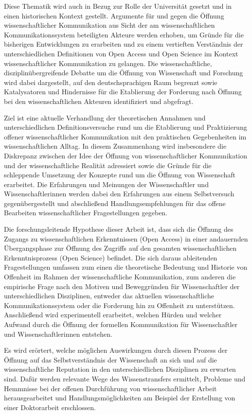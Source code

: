 Diese Thematik wird auch in Bezug zur Rolle der Universität gesetzt und in einen historischen Kontext gestellt. Argumente für und gegen die Öffnung wissenschaftlicher Kommunikation aus Sicht der am wissenschaftlichen Kommunikationssystem beteiligten Akteure werden erhoben, um Gründe für die bisherigen Entwicklungen zu erarbeiten und zu einem vertieften Verständnis der unterschiedlichen Definitionen von Open Access und Open Science im Kontext wissenschaftlicher Kommunikation zu gelangen. Die wissenschaftliche, disziplinübergreifende Debatte um die Öffnung von Wissenschaft und Forschung wird dabei dargestellt, auf den deutschsprachigen Raum begrenzt sowie Katalysatoren und Hindernisse für die Etablierung der Forderung nach Öffnung bei den wissenschaftlichen Akteuren identifiziert und abgefragt.

Ziel ist eine aktuelle Verhandlung der theoretischen Annahmen und unterschiedlichen Definitionsversuche rund um die Etablierung und Praktizierung offener wissenschaftlicher Kommunikation mit den praktischen Gegebenheiten im wissenschaftlichen Alltag. In diesem Zusammenhang wird insbesondere die Diskrepanz zwischen der Idee der Öffnung von wissenschaftlicher Kommunikation und der wissenschaftliche Realität \cite{Scheliga_2014} adressiert sowie die Gründe für die schleppende Umsetzung der Konzepte rund um die Öffnung von Wissenschaft erarbeitet. Die Erfahrungen und Meinungen der Wissenschaftler und Wissenschaftlerinnen werden dabei den Erfahrungen aus einem Selbstversuch gegenübergestellt und abschließend Handlungsempfehlungen für das offene Bearbeiten wissenschaftlicher Fragestellungen gegeben.

Die forschungsleitende Hypothese dieser Arbeit ist, dass sich die Öffnung des Zugangs zu wissenschaftlichen Erkenntnissen (Open Access) in einer andauernden Übergangsphase zur Öffnung des Zugriffs auf den gesamten wissenschaftlichen Erkenntnisprozess (Open Science) befindet. Die sich daraus ableitenden Fragestellungen umfassen zum einen die theoretische Bedeutung und Historie von Offenheit im Rahmen der wissenschaftliche Kommunikation, zum anderen die empirische Frage nach den Motiven und Beweggründen für Wissenschaftler der unterschiedlichen Disziplinen, entweder das aktuellen wissenschaftliche Kommunikationssystem oder die Forderung hin zu Offenheit zu unterstützen. Anschließend wird experimentell erarbeitet, welchen Hürden und welcher Aufwand durch die Öffnung der formellen Kommunikation für Wissenschaftler und Wissenschaftlerinnen entstehen.

Es wird erörtert, welche möglichen Auswirkungen durch diesen Prozess der Öffnung auf das Selbstverständnis der Wissenschaft an sich und auf die wissenschaftliche Reputation in den unterschiedlichen Disziplinen zu erwarten sind. Dafür werden relevante Wege des Wissenstransfers ermittelt, Probleme und Hemmnisse bei der offenen Durchführung von wissenschaftlicher Arbeit herausgearbeitet und Handlungsmöglichkeiten am Beispiel der Erstellung von einer Doktorarbeit erschlossen.

